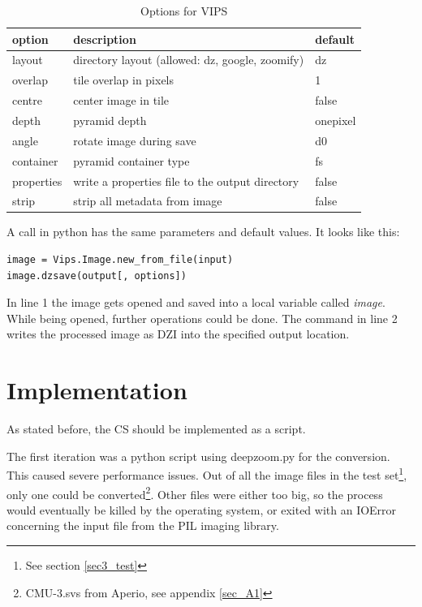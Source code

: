 \begin{table}[H]
	\begin{center}
		\begin{tabular}{| l | l | l |}
			\hline
			\textbf{option} & \textbf{description} & \textbf{default} \\ \hline
			layout & directory layout (allowed: dz, google, zoomify) & dz \\ \hline
			overlap & tile overlap in pixels & 1 \\ \hline
			centre & center image in tile & false \\ \hline
			depth & pyramid depth & onepixel \\ \hline
			angle & rotate image during save & d0 \\ \hline
			container & pyramid container type & fs \\ \hline
			properties & write a properties file to the output directory & false \\ \hline
			strip & strip all metadata from image & false \\ \hline
		\end{tabular}
		\caption{Options for VIPS}
		\label{tab3_optionsVips}
	\end{center}
\end{table}

A call in python has the same parameters and default values. It looks like this:

\begin{lstlisting}[frame=single]
image = Vips.Image.new_from_file(input)
image.dzsave(output[, options])
\end{lstlisting}

In line 1 the image gets opened and saved into a local variable called \emph{image}. While being opened, further operations could be done. The command in line 2 writes the processed image as DZI into the specified output location.


\section{Implementation}

As stated before, the CS should be implemented as a script.

The first iteration was a python script using deepzoom.py for the conversion. This caused severe performance issues. Out of all the image files in the test set\footnote{See section \ref{sec3_test}}, only one could be converted\footnote{CMU-3.svs from Aperio, see appendix \ref{sec_A1}}. Other files were either too big, so the process would eventually be killed by the operating system, or exited with an IOError concerning the input file from the PIL imaging library.

